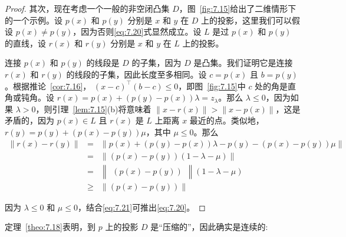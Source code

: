 \begin{proof}
其次，现在考虑一个一般的非空闭凸集 \(D\)，图~\ref{fig:7.15}给出了二维情形下的一个示例。设 \(p\left( x\right)\) 和 \(p\left( y\right)\) 分别是 \(x\) 和 \(y\) 在 \(D\) 上的投影，这里我们可以假设 \(p\left( x\right)  \neq  p\left( y\right)\)，因为否则\eqref{eq:7.20}式显然成立。设 \(L\) 是过 \(p\left( x\right)\) 和 \(p\left( y\right)\) 的直线，设 \(r\left( x\right)\) 和 \(r\left( y\right)\) 分别是 \(x\) 和 \(y\) 在 \(L\) 上的投影。

连接 \(p\left( x\right)\) 和 \(p\left( y\right)\) 的线段是 \(D\) 的子集，因为 \(D\) 是凸集。我们证明它是连接 \(r\left( x\right)\) 和 \(r\left( y\right)\) 的线段的子集，因此长度至多相同。设 \(c = p\left( x\right)\) 且 \(b = p\left( y\right)\)。根据推论~\ref{cor:7.16}， \({\left( x - c\right) }^{\top }\left( {b - c}\right)  \leq  0\)，即图~\ref{fig:7.15}中 \(c\) 处的角是直角或钝角。设 \(r\left( x\right)  = p\left( x\right)  + \left( {p\left( y\right)  - p\left( x\right) }\right) \lambda  = {z}_{\lambda }\)。那么 \(\lambda  \leq  0\)，因为如果 \(\lambda  > 0\)，则引理~\ref{lem:7.15}(b)将意味着 \(\parallel x - r\left( x\right) \parallel  > \parallel x - p\left( x\right) \parallel\)，这是矛盾的，因为 \(p\left( x\right)  \in  L\) 且 \(r\left( x\right)\) 是 \(L\) 上距离 \(x\) 最近的点。类似地， \(r\left( y\right)  = p\left( y\right)  + \left( {p\left( x\right)  - p\left( y\right) }\right) \mu\)，其中 \(\mu  \leq  0\)。那么
\begin{eqnarray*}
\parallel r\left( x\right)  - r\left( y\right) \parallel & =& \parallel p\left( x\right)  + \left( {p\left( y\right)  - p\left( x\right) }\right) \lambda  - p\left( y\right)  - \left( {p\left( x\right)  - p\left( y\right) }\right) \mu \parallel\\
&=& \parallel \left( {p\left( x\right)  - p\left( y\right) }\right) \left( {1 - \lambda  - \mu }\right) \parallel\\
&=& \begin{Vmatrix}\left( {p\left( x\right)  - p\left( y\right) }\right) \end{Vmatrix}\left( {1 - \lambda  - \mu }\right)\\
&\geq&  \parallel \left( {p\left( x\right)  - p\left( y\right) }\right) \parallel
\end{eqnarray*}

因为 \(\lambda  \leq  0\) 和 \(\mu  \leq  0\)，结合\eqref{eq:7.21}可推出\eqref{eq:7.20}。
\end{proof}


定理~\ref{theo:7.18}表明，到 \(p\) 上的投影 \(D\) 是“压缩的”，因此确实是连续的:

